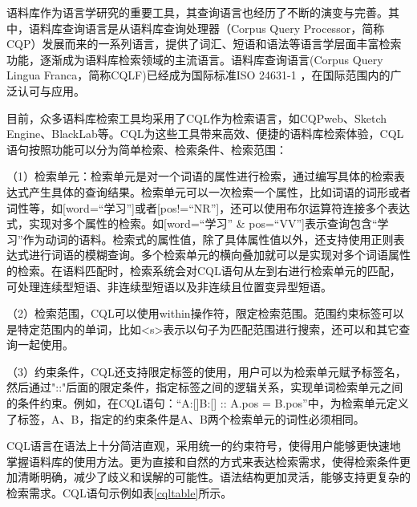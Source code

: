 \documentclass[11pt]{article}
\begin{document}
\begin{CJK*}{UTF8}{gbsn}
语料库作为语言学研究的重要工具，其查询语言也经历了不断的演变与完善。其中，语料库查询语言是从语料库查询处理器（Corpus Query Processor，简称CQP）发展而来的一系列语言，提供了词汇、短语和语法等语言学层面丰富检索功能\cite{wuliangping}，逐渐成为语料库检索领域的主流语言。语料库查询语言(Corpus Query Lingua Franca，简称CQLF)已经成为国际标准ISO 24631-1 \cite{banski-etal-2016-corpus}，在国际范围内的广泛认可与应用。

目前，众多语料库检索工具均采用了CQL作为检索语言，如CQPweb\cite{hardie2012cqpweb}、Sketch Engine\cite{sketchengine1}、BlackLab\cite{blacklab}等。CQL为这些工具带来高效、便捷的语料库检索体验，CQL语句按照功能可以分为简单检索、检索条件、检索范围\cite{Lu2024FromTT}：

（1）检索单元：检索单元是对一个词语的属性进行检索，通过编写具体的检索表达式产生具体的查询结果。检索单元可以一次检索一个属性，比如词语的词形或者词性等，如[word=“学习”]或者[pos!=“NR”]，还可以使用布尔运算符连接多个表达式，实现对多个属性的检索。如[word=“学习” \& pos=“VV”]表示查询包含“学习”作为动词的语料。检索式的属性值，除了具体属性值以外，还支持使用正则表达式进行词语的模糊查询。多个检索单元的横向叠加就可以是实现对多个词语属性的检索。在语料匹配时，检索系统会对CQL语句从左到右进行检索单元的匹配，可处理连续型短语、非连续型短语以及非连续且位置变异型短语\cite{wuliangping}。

（2）检索范围，CQL可以使用within操作符，限定检索范围。范围约束标签可以是特定范围内的单词，比如\textless s\textgreater 表示以句子为匹配范围进行搜索，还可以和其它查询一起使用。

（3）约束条件，CQL还支持限定标签的使用，用户可以为检索单元赋予标签名，然后通过"::"后面的限定条件，指定标签之间的逻辑关系，实现单词检索单元之间的条件约束。例如，在CQL语句：“A:[]B:[] :: A.pos = B.pos”中，为检索单元定义了标签，A、B，指定的约束条件是A、B两个检索单元的词性必须相同。

CQL语言在语法上十分简洁直观，采用统一的约束符号，使得用户能够更快速地掌握语料库的使用方法。更为直接和自然的方式来表达检索需求，使得检索条件更加清晰明确，减少了歧义和误解的可能性。语法结构更加灵活，能够支持更复杂的检索需求。CQL语句示例如表\ref{cqltable}所示。


\end{CJK*}
\end{document}
